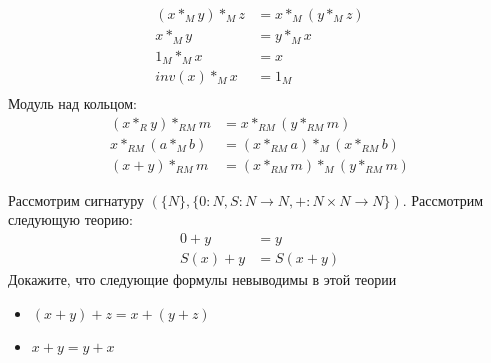 \begin{solution}
\begin{equation*}
\begin{split}
	(x *_M y) *_M z &= x *_M (y *_M z)\\
	x *_M y &= y *_M x\\
	1_M *_M x &= x\\
	inv(x) *_M x &= 1_M\\
\end{split}
\end{equation*}
Модуль над кольцом:
\begin{equation*}
\begin{split}
	(x *_R y) *_{RM} m &= x *_{RM} (y *_{RM} m)\\
	x *_{RM} (a *_M b) &= (x *_{RM} a) *_M (x *_{RM} b)\\
	(x + y) *_{RM} m &= (x *_{RM} m) *_M (y *_{RM} m)
\end{split}
\end{equation*}
\xqed
\end{solution}

\begin{task}[2]
Рассмотрим сигнатуру $(\{N\}, \{ 0 : N, S : N \to N, + : N \times N \to N \})$.
    Рассмотрим следующую теорию:
\begin{align*}
0 + y & = y \\
S(x) + y & = S(x + y)
\end{align*}
Докажите, что следующие формулы невыводимы в этой теории
\begin{itemize}
\item $(x + y) + z = x + (y + z)$
\item $x + y = y + x$
\end{itemize}
\end{task}

